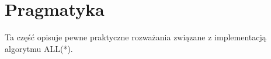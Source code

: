 ﻿\section{Pragmatyka}
Ta część opisuje pewne praktyczne rozważania
związane z implementacją algorytmu ALL(*).
